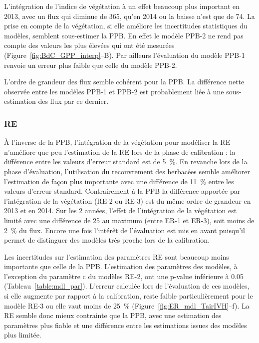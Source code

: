 L'intégration de l'indice de végétation à un effet beaucoup plus important en 2013, avec un flux qui diminue de \SI{365}{\gcma}, qu'en 2014 ou la baisse n'est que de \SI{74}{\gcma}.
La prise en compte de la végétation, si elle améliore les incertitudes statistiques du modèles, semblent sous-estimer la PPB.
En effet le modèle PPB-2 ne rend pas compte des valeurs les plus élevées qui ont été mesurées (Figure~\ref{fig:BdC_GPP_interp}--B).
Par ailleurs l'évaluation du modèle PPB-1 renvoie un erreur plus faible que celle du modèle PPB-2.

L'ordre de grandeur des flux semble cohérent pour la PPB. La différence nette observée entre les modèles PPB-1 et PPB-2 est probablement liée à une sous-estimation des flux par ce dernier.

\subsubsection{RE}

À l'inverse de la PPB, l'intégration de la végétation pour modéliser la RE n'améliore que peu l'estimation de la RE lors de la phase de calibration : la différence entre les valeurs d'erreur standard est de \SI{5}{\percent}.
En revanche lors de la phase d'évaluation, l'utilisation du recouvrement des herbacées semble améliorer l'estimation de façon plus importante avec une différence de \SI{11}{\percent} entre les valeurs d'erreur standard.
Contrairement à la PPB la différence apportée par l'intégration de la végétation (RE-2 ou RE-3) est du même ordre de grandeur en 2013 et en 2014.
Sur les 2 années, l'effet de l'intégration de la végétation est limité avec une différence de \SI{25}{\gcma} au maximum (entre ER-1 et ER-3), soit moins de \SI{2}{\percent} du flux.
Encore une fois l'intérêt de l'évaluation est mis en avant puisqu'il permet de distinguer des modèles très proche lors de la calibration.

Les incertitudes sur l'estimation des paramètres RE sont beaucoup moins importante que celle de la PPB.
L'estimation des paramètres des modèles, à l'exception du paramètre c du modèles RE-2, ont une p-value inférieure à 0.05 (Tableau~\ref{table:mdl_par}).
L'erreur calculée lors de l'évaluation de ces modèles, si elle augmente par rapport à la calibration, reste faible particulièrement pour le modèle RE-3 ou elle vaut moins de \SI{25}{\percent} (Figure~\ref{fig:ER_mdl_TairIVH}--f).
La RE semble donc mieux contrainte que la PPB, avec une estimation des paramètres plus fiable et une différence entre les estimations issues des modèles plus limitée.

